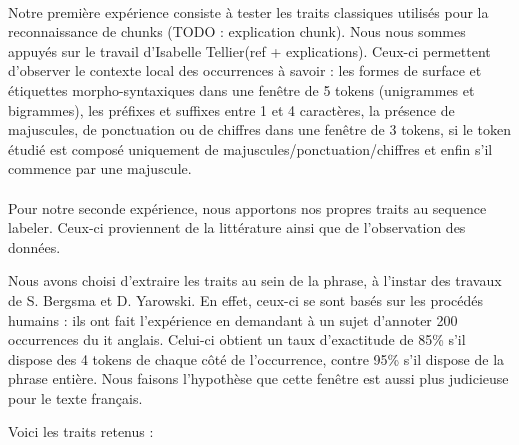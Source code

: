 \documentclass[a4paper,12pt]{article}
\begin{document}
\paragraph{}
Notre première expérience consiste à tester les traits classiques utilisés pour la reconnaissance de chunks (TODO : explication chunk). Nous nous sommes appuyés sur le travail d'Isabelle Tellier(ref + explications). Ceux-ci permettent d'observer le contexte local des occurrences à savoir : les formes de surface et étiquettes morpho-syntaxiques dans une fenêtre de 5 tokens (unigrammes et bigrammes), les préfixes et suffixes entre 1 et 4 caractères, la présence de majuscules, de ponctuation ou de chiffres dans une fenêtre de 3 tokens, si le token étudié est composé uniquement de majuscules/ponctuation/chiffres et enfin s'il commence par une majuscule.

\paragraph{}
Pour notre seconde expérience, nous apportons nos propres traits au sequence labeler. Ceux-ci proviennent de la littérature ainsi que de l'observation des données.

Nous avons choisi d'extraire les traits au sein de la phrase, à l'instar des travaux de S. Bergsma et D. Yarowski. En effet, ceux-ci se sont basés sur les procédés humains : ils ont fait l'expérience en demandant à un sujet d'annoter 200 occurrences du \og{}it\fg{} anglais. Celui-ci obtient un taux d'exactitude de 85\% s'il dispose des 4 tokens de chaque côté de l'occurrence, contre 95\% s'il dispose de la phrase entière. Nous faisons l'hypothèse que cette fenêtre est aussi plus judicieuse pour le texte français.

Voici les traits retenus :
\end{document}

